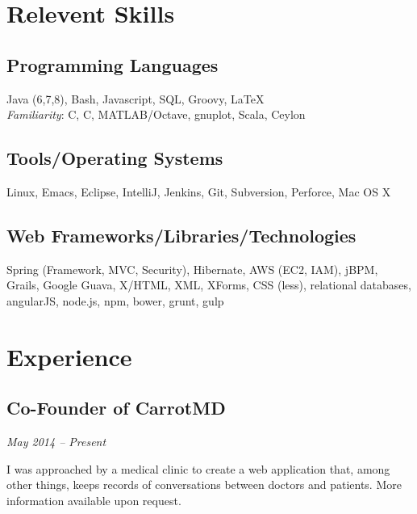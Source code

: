 \documentclass[a4paper,11pt]{article}
\newcommand{\CC}{C\nolinebreak\hspace{-.05em}\raisebox{.4ex}{\tiny\bf
    +}\nolinebreak\hspace{-.10em}\raisebox{.4ex}{\tiny\bf +}}
\def\CC{{C\nolinebreak[4]\hspace{-.05em}\raisebox{.4ex}{\tiny\bf ++}}}
\begin{document}

  \section*{Relevent Skills}

  \begin{multicols}{2}
    \raggedright

    \subsection*{Programming Languages}

    Java (6,7,8), Bash, Javascript, SQL, Groovy, \LaTeX \\
    \textsl{Familiarity}: C, \CC, MATLAB/Octave, gnuplot, Scala, Ceylon

    \subsection*{Tools/Operating Systems}

    Linux, Emacs, Eclipse, IntelliJ, Jenkins, Git, Subversion, Perforce, Mac OS
    X

    \subsection*{Web Frameworks/Libraries/Technologies}

    Spring (Framework, MVC, Security), Hibernate, AWS (EC2, IAM), jBPM, Grails, Google Guava,
    X/HTML, XML, XForms, CSS (less), relational databases, angularJS, node.js, npm, bower, grunt,
    gulp
    
    
  \end{multicols}
  

\section*{Experience}

\subsection*{Co-Founder of CarrotMD} 
\vskip -20pt
\hfill \textit{May 2014 -- Present}

I was approached by a medical clinic to create a web application that, among other things, keeps
records of conversations between doctors and patients. More information available upon request.
\end{document}
